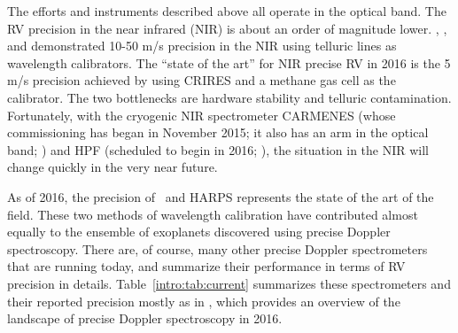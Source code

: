 The efforts and instruments described above all operate in the optical
band. The RV precision in the near infrared (NIR) is about an order of
magnitude lower. \cite{2010ApJ...723..684B},
\cite{2010A&A...511A..55F}, and \cite{2012ApJ...749...16B}
demonstrated 10-50 m/s precision in the NIR using telluric lines as
wavelength calibrators. The ``state of the art'' for NIR precise RV in
2016 is the 5 m/s precision achieved by \cite{2010ApJ...713..410B}
using CRIRES and a methane gas cell as the calibrator. The two
bottlenecks are hardware stability and telluric
contamination. Fortunately, with the cryogenic NIR spectrometer
CARMENES (whose commissioning has began in November 2015; it also has
an arm in the optical band; \citealt{2014SPIE.9147E..1FQ}) and HPF
(scheduled to begin in 2016; \citealt{2012SPIE.8446E..1SM}), the
situation in the NIR will change quickly in the very near future.

As of 2016, the precision of \keck\ and HARPS represents the state of
the art of the field. These two methods of wavelength calibration have
contributed almost equally to the ensemble of exoplanets discovered
using precise Doppler spectroscopy. There are, of course, many other
precise Doppler spectrometers that are running today, and
\cite{eprv2015} summarize their performance in terms of RV precision
in details. Table~\ref{intro:tab:current} summarizes these
spectrometers and their reported precision mostly as in
\cite{eprv2015}, which provides an overview of the landscape of
precise Doppler spectroscopy in 2016.

